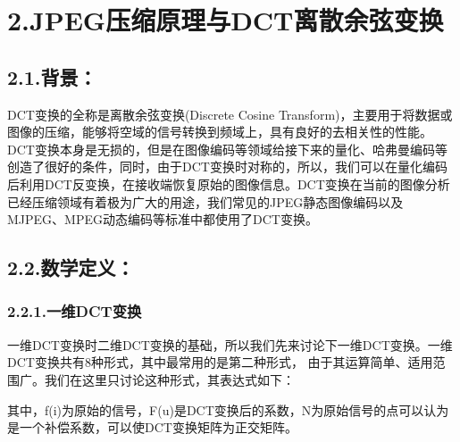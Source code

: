 \documentclass[a4paper, 12pt]{ctexart}
\begin{document}
\section{2.\hspace*{0.5em}JPEG压缩原理与DCT离散余弦变换}\label{sec-jpegdct}%

\subsection{2.1.\hspace*{0.5em}背景：}\label{section}%

\noindent{}DCT变换的全称是离散余弦变换(Discrete Cosine Transform)，主要用于将数据或图像的压缩，能够将空域的信号转换到频域上，具有良好的去相关性的性能。DCT变换本身是无损的，但是在图像编码等领域给接下来的量化、哈弗曼编码等创造了很好的条件，同时，由于DCT变换时对称的，所以，我们可以在量化编码后利用DCT反变换，在接收端恢复原始的图像信息。DCT变换在当前的图像分析已经压缩领域有着极为广大的用途，我们常见的JPEG静态图像编码以及MJPEG、MPEG动态编码等标准中都使用了DCT变换。%


\subsection{2.2.\hspace*{0.5em}数学定义：}\label{section}%

\subsubsection{2.2.1.\hspace*{0.5em}一维DCT变换}\label{sec-dct}%

\noindent{}一维DCT变换时二维DCT变换的基础，所以我们先来讨论下一维DCT变换。一维DCT变换共有8种形式，其中最常用的是第二种形式，
由于其运算简单、适用范围广。我们在这里只讨论这种形式，其表达式如下：%


其中，f(i)为原始的信号，F(u)是DCT变换后的系数，N为原始信号的点可以认为是一个补偿系数，可以使DCT变换矩阵为正交矩阵。%
\end{document}

